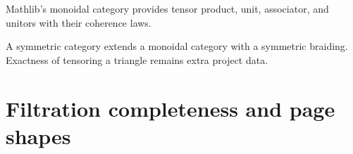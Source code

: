 \begin{definition}
  \label{def:mathlib-monoidal-category}
  \mathlibok
  Mathlib's monoidal category provides tensor product, unit, associator, and
  unitors with their coherence laws.
\end{definition}

\begin{definition}
  \label{def:mathlib-symmetric-category}
  \mathlibok
  A symmetric category extends a monoidal category with a symmetric braiding.
  Exactness of tensoring a triangle remains extra project data.
\end{definition}

\section{Filtration completeness and page shapes}

